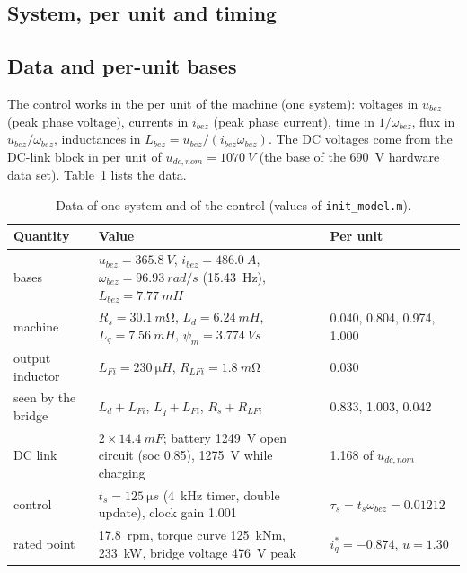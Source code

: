 \documentclass[10pt,a4paper]{scrartcl}
\newcommand{\ts}{t_s}
\newcommand{\tspu}{\tau_s}
\newcommand{\code}[1]{\texttt{#1}}
\newcommand{\ub}{u_{bez}}
\newcommand{\ib}{i_{bez}}
\newcommand{\wb}{\omega_{bez}}
\newcommand{\udcn}{u_{dc,nom}}
\begin{document}
\begin{onehalfspace}
\section{System, per unit and timing}
\label{sec:system}

\subsection{Data and per-unit bases}

The control works in the per unit of the machine (one system): voltages in $\ub$ (peak phase voltage), currents in $\ib$ (peak phase current), time in $1/\wb$, flux in $\ub/\wb$, inductances in $L_{bez} = \ub/(\ib\wb)$. The DC voltages come from the DC-link block in per unit of $\udcn = \SI{1070}{V}$ (the base of the \SI{690}{V} hardware data set). Table~\ref{tab:data} lists the data.

\begin{table}[htb]
\centering
\caption{Data of one system and of the control (values of \code{init\_model.m}).}
\label{tab:data}
\small
\begin{tabularx}{\textwidth}{@{}l>{\raggedright\arraybackslash}Xl@{}}
\toprule
Quantity & Value & Per unit \\
\midrule
bases & $\ub = \SI{365.8}{V}$, $\ib = \SI{486.0}{A}$, $\wb = \SI{96.93}{rad/s}$ (\SI{15.43}{Hz}), $L_{bez} = \SI{7.77}{mH}$ & \\
machine & $R_s = \SI{30.1}{m\ohm}$, $L_d = \SI{6.24}{mH}$, $L_q = \SI{7.56}{mH}$, $\psi_m = \SI{3.774}{Vs}$ & 0.040, 0.804, 0.974, 1.000 \\
output inductor & $L_{Fi} = \SI{230}{\micro H}$, $R_{LFi} = \SI{1.8}{m\ohm}$ & 0.030 \\
seen by the bridge & $L_d + L_{Fi}$, $L_q + L_{Fi}$, $R_s + R_{LFi}$ & 0.833, 1.003, 0.042 \\
DC link & $2\times\SI{14.4}{mF}$; battery \SI{1249}{V} open circuit (soc 0.85), \SI{1275}{V} while charging & 1.168 of $\udcn$ \\
control & $\ts = \SI{125}{\micro s}$ (\SI{4}{kHz} timer, double update), clock gain 1.001 & $\tspu = \ts\wb = 0.01212$ \\
rated point & \SI{17.8}{rpm}, torque curve \SI{125}{kNm}, \SI{233}{kW}, bridge voltage \SI{476}{V} peak & $i_q^* = -0.874$, $u = 1.30$ \\
\bottomrule
\end{tabularx}
\end{table}


\end{onehalfspace}
\end{document}
